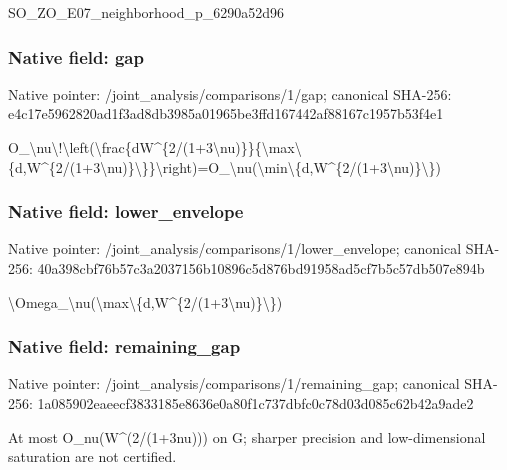 \documentclass[10pt,a4paper]{article}
\begin{document}
\begingroup\raggedright\sloppy SO\_\allowbreak{}ZO\_\allowbreak{}E07\_\allowbreak{}neighborhood\_\allowbreak{}p\_\allowbreak{}6290a52d96\par\endgroup

\subsubsection{Native field: gap}
Native pointer: /joint\_\allowbreak{}analysis/comparisons/1/gap; canonical SHA-256: e4c17e5962820ad1f3ad8db3985a01965be3ffd167442af88167c1957b53f4e1

\begingroup\raggedright\sloppy O\_\allowbreak{}\textbackslash{}nu\textbackslash{}!\textbackslash{}left(\textbackslash{}frac\{dW\textasciicircum{}\{2/\allowbreak{}(1+3\textbackslash{}nu)\}\}\{\textbackslash{}max\textbackslash{}\{d,\allowbreak{}W\textasciicircum{}\{2/\allowbreak{}(1+3\textbackslash{}nu)\}\textbackslash{}\}\}\textbackslash{}right)=\allowbreak{}O\_\allowbreak{}\textbackslash{}nu(\textbackslash{}min\textbackslash{}\{d,\allowbreak{}W\textasciicircum{}\{2/\allowbreak{}(1+3\textbackslash{}nu)\}\textbackslash{}\})\par\endgroup

\subsubsection{Native field: lower\_\allowbreak{}envelope}
Native pointer: /joint\_\allowbreak{}analysis/comparisons/1/lower\_\allowbreak{}envelope; canonical SHA-256: 40a398cbf76b57c3a2037156b10896c5d876bd91958ad5cf7b5c57db507e894b

\begingroup\raggedright\sloppy \textbackslash{}Omega\_\allowbreak{}\textbackslash{}nu(\textbackslash{}max\textbackslash{}\{d,\allowbreak{}W\textasciicircum{}\{2/\allowbreak{}(1+3\textbackslash{}nu)\}\textbackslash{}\})\par\endgroup

\subsubsection{Native field: remaining\_\allowbreak{}gap}
Native pointer: /joint\_\allowbreak{}analysis/comparisons/1/remaining\_\allowbreak{}gap; canonical SHA-256: 1a085902eaeecf3833185e8636e0a80f1c737dbfc0c78d03d085c62b42a9ade2

\begingroup\raggedright\sloppy At most O\_\allowbreak{}nu(W\textasciicircum{}(2/\allowbreak{}(1+3nu))) on G;\allowbreak{} sharper precision and low-dimensional saturation are not certified.\par\endgroup
\end{document}
